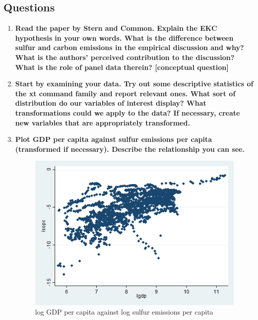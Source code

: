 \documentclass{scrartcl}
\begin{document}
	\subsection*{Questions}
	
	\begin{enumerate}
	\item \textbf{Read the paper by Stern and Common. Explain the EKC hypothesis in your own words. What is the difference between sulfur and carbon emissions in the empirical discussion and why? What is the authors' perceived contribution to the discussion? What is the role of panel data therein? [conceptual question]}
		
	\item \textbf{Start by examining your data. Try out some descriptive statistics of the xt command family and report relevant ones. What sort of distribution do our variables of interest display? What transformations could we apply to the data? If necessary, create new variables that are appropriately transformed.}
	
	
	
	\item \textbf{Plot GDP per capita against sulfur emissions per capita (transformed if necessary). Describe the relationship you can see.}
	
	
	
	 \begin{figure}
      \includegraphics[width=12cm]{../stata/lsopc_lgdp.png}
      \caption{log GDP per capita against log sulfur emissions per capita}
    \end{figure}
	

\end{enumerate}
\end{document}

